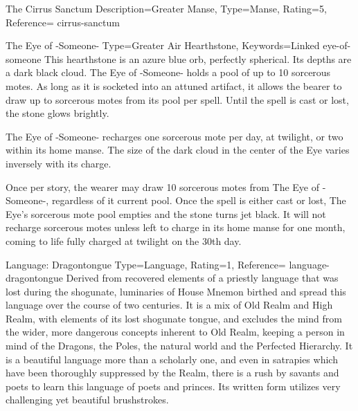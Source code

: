 \begin{Merit}{The Cirrus Sanctum}{%
    Description=Greater Manse,
    Type=Manse,
    Rating=5,
    Reference=\cite*[p.~163]{ex3}
}{cirrus-sanctum}
    \begin{Hearthstone}{The Eye of -Someone-}{%
        Type=Greater Air Hearthstone,
        Keywords=Linked
    }{eye-of-someone}
        This hearthstone is an azure blue orb, perfectly spherical. Its depths
        are a dark black cloud. The Eye of -Someone- holds a pool of up to 10
        sorcerous motes. As long as it is socketed into an attuned artifact,
        it allows the bearer to draw up to  sorcerous
        motes from its pool per spell. Until the spell is cast or lost, the
        stone glows brightly.

        The Eye of -Someone- recharges one sorcerous mote per day, at twilight,
        or two within its home manse. The size of the dark cloud in the center
        of the Eye varies inversely with its charge.

        Once per story, the wearer may draw 10 sorcerous motes from The Eye of
        -Someone-, regardless of it current pool. Once the spell is either cast
        or lost, The Eye's sorcerous mote pool empties and the stone turns jet
        black. It will not recharge sorcerous motes unless left to charge in
        its home manse for one month, coming to life fully charged at twilight
        on the 30th day.
    \end{Hearthstone}
\end{Merit}


\DocumentColumnBreak
\begin{Merit}{Language: Dragontongue}{%
    Type=Language,
    Rating=1,
    Reference=\cite*[p.~162]{ex3}
}{language-dragontongue}
    Derived from recovered elements of a priestly language that was lost during
    the shogunate, luminaries of House Mnemon birthed and spread this language
    over the course of two centuries. It is a mix of Old Realm and High Realm,
    with elements of its lost shogunate tongue, and excludes the mind from the
    wider, more dangerous concepts inherent to Old Realm, keeping a person in
    mind of the Dragons, the Poles, the natural world and the Perfected
    Hierarchy. It is a beautiful language more than a scholarly one, and even
    in satrapies which have been thoroughly suppressed by the Realm, there is a
    rush by savants and poets to learn this language of poets and princes. Its
    written form utilizes very challenging yet beautiful brushstrokes.
\end{Merit}



